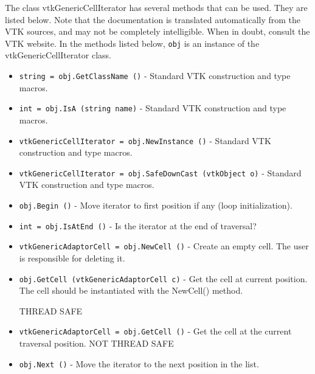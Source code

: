 The class vtkGenericCellIterator has several methods that can be used.
  They are listed below.
Note that the documentation is translated automatically from the VTK sources,
and may not be completely intelligible.  When in doubt, consult the VTK website.
In the methods listed below, \verb|obj| is an instance of the vtkGenericCellIterator class.
\begin{itemize}
\item  \verb|string = obj.GetClassName ()| -  Standard VTK construction and type macros.

\item  \verb|int = obj.IsA (string name)| -  Standard VTK construction and type macros.

\item  \verb|vtkGenericCellIterator = obj.NewInstance ()| -  Standard VTK construction and type macros.

\item  \verb|vtkGenericCellIterator = obj.SafeDownCast (vtkObject o)| -  Standard VTK construction and type macros.

\item  \verb|obj.Begin ()| -  Move iterator to first position if any (loop initialization).

\item  \verb|int = obj.IsAtEnd ()| -  Is the iterator at the end of traversal?

\item  \verb|vtkGenericAdaptorCell = obj.NewCell ()| -  Create an empty cell. The user is responsible for deleting it.
 

\item  \verb|obj.GetCell (vtkGenericAdaptorCell c)| -  Get the cell at current position. The cell should be instantiated
 with the NewCell() method.
 
 
 THREAD SAFE

\item  \verb|vtkGenericAdaptorCell = obj.GetCell ()| -  Get the cell at the current traversal position.
 NOT THREAD SAFE
 
 

\item  \verb|obj.Next ()| -  Move the iterator to the next position in the list.
 

\end{itemize}
